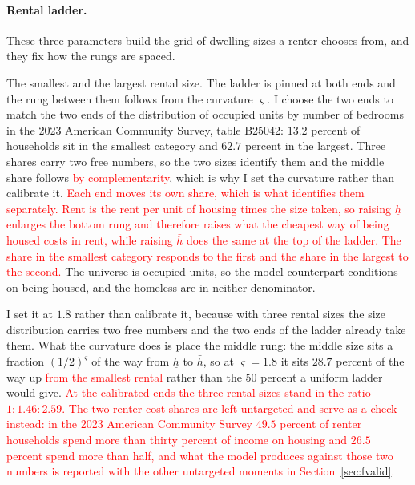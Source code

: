 \documentclass[10pt]{article}
\begin{document}
\paragraph{Rental ladder.} These three parameters build the grid of dwelling sizes a renter chooses from, and they fix how the rungs are spaced.
\begin{description}\setlength{\itemsep}{0.25em}\setlength{\parskip}{0em}
\item[$\underline h$ and $\bar h$, the rental ladder.] The smallest and
the largest rental size. The ladder is pinned at both ends and the rung between
them follows from the curvature $\varsigma$.
I choose the two ends to match the two ends of the distribution of occupied units
by number of bedrooms in the 2023 American Community Survey, table B25042: $13.2$
percent of households sit in the smallest category and $62.7$ percent in the
largest. Three shares carry two free numbers, so the two sizes identify them and the
middle share follows \textcolor{red}{by complementarity}, which is why I set the curvature rather
than calibrate it. \textcolor{red}{Each end moves its own share, which is what identifies them
separately. Rent is the rent per unit of housing times the size taken, so raising
$\underline h$ enlarges the bottom rung and therefore raises what the cheapest way
of being housed costs in rent, while raising $\bar h$ does the same at the top of the
ladder. The share in the smallest category responds to the first and the share in
the largest to the second.} The universe is occupied units, so the
model counterpart conditions on being housed, and the homeless are in neither
denominator.
\item[$\varsigma$, the curvature of the rental ladder.]
I set it at $1.8$ rather than calibrate it, because with three rental sizes the
size distribution carries two free numbers and the two ends of the ladder already
take them. What the curvature does is place the middle rung: the middle size sits a
fraction $(1/2)^{\varsigma}$ of the way from $\underline h$ to $\bar h$, so at
$\varsigma=1.8$ it sits $28.7$ percent of the way up \textcolor{red}{from the smallest rental}
rather than the $50$ percent a uniform ladder would give. \textcolor{red}{At the calibrated ends
the three rental sizes stand in the ratio $1 : 1.46 : 2.59$. The two renter cost
shares are left untargeted and serve as a check instead: in the 2023 American
Community Survey $49.5$ percent of renter households spend more than thirty percent
of income on housing and $26.5$ percent spend more than half, and what the model
produces against those two numbers is reported with the other untargeted moments in
Section~\ref{sec:fvalid}.}

\end{description}
\end{document}
